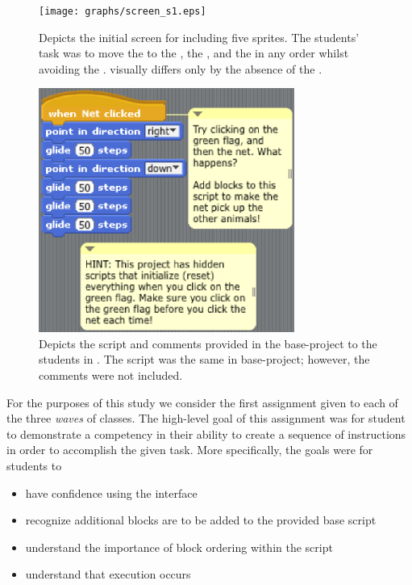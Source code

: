 \begin{figure}[!t]
\centering \texttt{[image: graphs/screen\_s1.eps]}
\caption{Depicts the initial screen for \sone{} including five sprites. The
  students' task was to move the \net{} to \catch{} the \bear{}, the \horse{},
  and the \zebra{} in any order whilst avoiding the \snake{}. \stwo{} visually
  differs only by the absence of the \snake{}.}
\end{figure}


\begin{figure}[!t]
\centering \includegraphics[width=3.3in]{graphs/screen_blocks.eps}
\caption{Depicts the script and comments provided in the base-project to the
  students in \stwo{}. The script was the same in  base-project;
  however, the comments were not included.}
\end{figure}


For the purposes of this study we consider the first assignment given to each
of the three \emph{waves} of classes. The high-level goal of this assignment
was for student to demonstrate a competency in their ability to create a
sequence of instructions in order to accomplish the given task. More
specifically, the goals were for students to

\begin{itemize}
\item have confidence using the interface
\item recognize additional blocks are to be added to the provided base script
\item understand the importance of block ordering within the script
\item understand that execution occurs \netclicked{}
\end{itemize}

